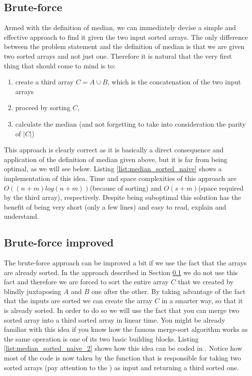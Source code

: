 \subsection{Brute-force}
\label{median_sorted_arrays:sec:bruteforce}
Armed with the definition of median, we can immediately devise a simple and effective approach to
find it given the two input sorted arrays. The only difference between the problem statement and the
definition of median is that we are given two sorted arrays and not just one. Therefore it is
natural that the very first thing that should come to mind is to:
\begin{enumerate}
	\item create a third array $C = A \cup B$, which is the concatenation of the two input arrays
	\item proceed by sorting $C$,
	\item calculate the median (and not forgetting to take into consideration the parity of $|C|$)
\end{enumerate}

This approach is clearly correct as it is basically a direct consequence and application of the
definition of median given above, but it is far from being optimal, as we will see below. Listing
\ref{list:median_sorted_naive} shows a \CC implementation of this idea. Time and space complexities
of this approach are $O((n+m)log(n+m))$(because of sorting) and $O(s+m)$(space required by the third
array), respectively. Despite being suboptimal this solution has the benefit of being very short (only a few lines)
and easy to read, explain and understand.




\subsection{Brute-force improved}
\label{median_sorted_arrays:sec:bruteforce_improved}
The brute-force approach can be improved a bit if we use the fact that the arrays are already
sorted. In the approach described in Section \ref{median_sorted_arrays:sec:bruteforce} we do not use
this fact and therefore we are forced to sort the entire array $C$ that we created by blindly juxtaposing $A$ and $B$ one after the other.
By taking advantage of the fact that the inputs are sorted we can create the array $C$ in a smarter way,
so that it is already sorted. In order to do so we will use the fact that you can merge two sorted array into a third sorted array in linear time.
You might be already familiar with this idea if you know how the famous merge-sort algorithm\cite{wiki:mergesort} works as the same operation is one of its two basic building blocks.
Listing \ref{list:median_sorted_naive_2} shows how this idea can be coded in \CC. Notice how most of the code is now taken by the  function that 
is responsible for taking two sorted arrays (pay attention to the ) as input and returning a third sorted one. 

